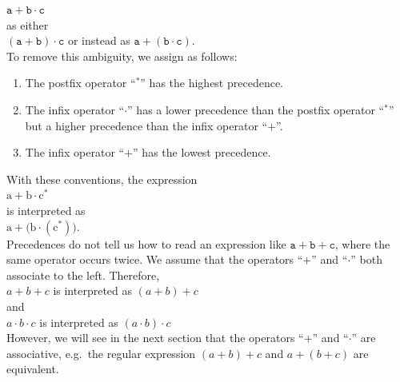 \hspace*{1.3cm}
$\mathtt{a} + \mathtt{b} \cdot \mathtt{c}$
\\[0.2cm]
as either 
\\[0.2cm]
\hspace*{1.3cm}
$(\mathtt{a} + \mathtt{b}) \cdot \mathtt{c}$ \quad or instead as \quad $\mathtt{a} + (\mathtt{b} \cdot \mathtt{c})$.
\\[0.2cm]
To remove this ambiguity, we assign  as follows:
\begin{enumerate}
\item The postfix operator ``$^*$'' has the highest precedence.
\item The infix operator ``$\cdot$'' has a lower precedence than the postfix operator ``$^*$'' but a higher precedence
      than the infix operator ``$+$''.
\item The infix operator ``$+$'' has the lowest precedence.
\end{enumerate}
With these conventions, the expression
\\[0.2cm]
\hspace*{1.3cm}
$\mathrm{a} + \mathrm{b} \cdot \mathrm{c}^*$
\\[0.2cm]
is interpreted as
\\[0.2cm]
\hspace*{1.3cm}
$\mathrm{a} + \bigl( \mathrm{b} \cdot (\mathrm{c}^*) \bigr)$.
\\[0.2cm]
Precedences do not tell us how to read an expression like $\mathtt{a} + \mathtt{b} + \mathtt{c}$, where the same
operator occurs twice.  We assume that the operators ``$+$'' and ``$\cdot$'' both associate to the left.
Therefore, 
\\[0.2cm]
\hspace*{1.3cm}
$a + b + c$
is interpreted as 
$(a + b) + c$
\\[0.2cm]
and
\\[0.2cm]
\hspace*{1.3cm}
$a \cdot b \cdot c$
is interpreted as 
$(a \cdot b) \cdot c$
\\[0.2cm]
However, we will see in the next section that the operators ``$+$'' and ``$\cdot$'' are
associative, e.g.~the regular expression $(a+b)+c$ and $a + (b+c)$ are equivalent.

